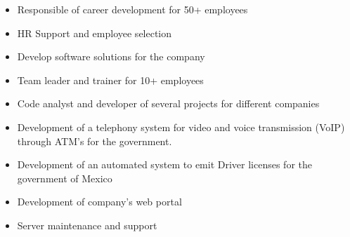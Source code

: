 
\begin{itemize}
\item Responsible of career development for 50+ employees
\item HR Support and employee selection
\end{itemize}


\begin{itemize}
\item Develop software solutions for the company
\item Team leader and trainer for 10+ employees
\end{itemize}

\begin{itemize}
\item Code analyst and developer of several projects for different companies
\end{itemize}

\begin{itemize}
\item Development of a telephony system for video and voice transmission
(VoIP) through ATM's for the government.
\item Development of an automated system to emit Driver licenses for the government of Mexico
\item Development of company's web portal
\item Server maintenance and support
\end{itemize}



\hspace*{-7em}  %

